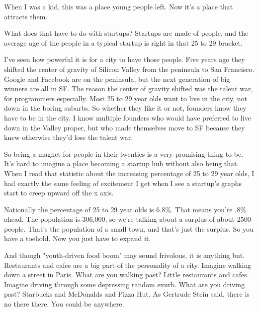 When
                  I was a kid, this was a place young people left. Now it's a
                  place that attracts them.

What does that have to do
                  with startups? Startups are made of people, and the average
                  age of the people in a typical startup is right in that 25 to
                  29 bracket.

I've seen how powerful it is for a city
                  to have those people. Five years ago they shifted the center
                  of gravity of Silicon Valley from the peninsula to San
                  Francisco. Google and Facebook are on the peninsula, but the
                  next generation of big winners are all in SF. The reason the
                  center of gravity shifted was the talent war, for programmers
                  especially. Most 25 to 29 year olds want to live in the city,
                  not down in the boring suburbs. So whether they like it or
                  not, founders know they have to be in the city. I know
                  multiple founders who would have preferred to live down in the
                  Valley proper, but who made themselves move to SF because they
                  knew otherwise they'd lose the talent war.

So being
                  a magnet for people in their twenties is a very promising
                  thing to be. It's hard to imagine a place becoming a startup
                  hub without also being that. When I read that statistic about
                  the increasing percentage of 25 to 29 year olds, I had exactly
                  the same feeling of excitement I get when I see a startup's
                  graphs start to creep upward off the x axis.

Nationally
                  the percentage of 25 to 29 year olds is 6.8\%. That means
                  you're .8\% ahead. The population is 306,000, so we're talking
                  about a surplus of about 2500 people. That's the population of
                  a small town, and that's just the surplus. So you have a
                  toehold. Now you just have to expand it.

And though
                  "youth-driven food boom" may sound frivolous, it is anything
                  but. Restaurants and cafes are a big part of the personality
                  of a city. Imagine walking down a street in Paris. What are
                  you walking past? Little restaurants and cafes. Imagine
                  driving through some depressing random exurb. What are you
                  driving past? Starbucks and McDonalds and Pizza Hut. As
                  Gertrude Stein said, there is no there there. You could be
                  anywhere.

